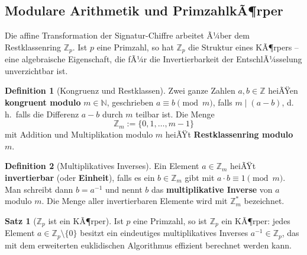 ﻿\documentclass[a4paper,12pt]{scrreprt}
\theoremstyle{definition}
\newtheorem{definition}{Definition}[section]
\newtheorem{satz}{Satz}[section]
\begin{document}
\subsection{Modulare Arithmetik und PrimzahlkÃ¶rper}

Die affine Transformation der Signatur-Chiffre arbeitet Ã¼ber dem Restklassenring $\mathbb{Z}_p$. Ist $p$ eine Primzahl, so hat $\mathbb{Z}_p$ die Struktur eines KÃ¶rpers -- eine algebraische Eigenschaft, die fÃ¼r die Invertierbarkeit der EntschlÃ¼sselung unverzichtbar ist.

\begin{definition}[Kongruenz und Restklassen]
	\label{def:kongruenz}
	Zwei ganze Zahlen $a, b \in \mathbb{Z}$ heiÃŸen \textbf{kongruent modulo} $m \in \mathbb{N}$, geschrieben $a \equiv b \pmod{m}$, falls $m \mid (a-b)$, d.\,h.\ falls die Differenz $a - b$ durch $m$ teilbar ist. Die Menge
	\[
	\mathbb{Z}_m := \{0, 1, \ldots, m-1\}
	\]
	mit Addition und Multiplikation modulo $m$ heiÃŸt \textbf{Restklassenring modulo} $m$.
\end{definition}

\begin{definition}[Multiplikatives Inverses]
	\label{def:inv}
	Ein Element $a \in \mathbb{Z}_m$ heiÃŸt \textbf{invertierbar} (oder \textbf{Einheit}), falls es ein $b \in \mathbb{Z}_m$ gibt mit $a \cdot b \equiv 1 \pmod{m}$. Man schreibt dann $b = a^{-1}$ und nennt $b$ das \textbf{multiplikative Inverse} von $a$ modulo $m$. Die Menge aller invertierbaren Elemente wird mit $\mathbb{Z}_m^*$ bezeichnet.
\end{definition}

\begin{satz}[$\mathbb{Z}_p$ ist ein KÃ¶rper]
	\label{satz:koerper}
	Ist $p$ eine Primzahl, so ist $\mathbb{Z}_p$ ein KÃ¶rper: jedes Element $a \in \mathbb{Z}_p \setminus \{0\}$ besitzt ein eindeutiges multiplikatives Inverses $a^{-1} \in \mathbb{Z}_p$, das mit dem erweiterten euklidischen Algorithmus \cite{Buc16} effizient berechnet werden kann.
\end{satz}
\end{document}
